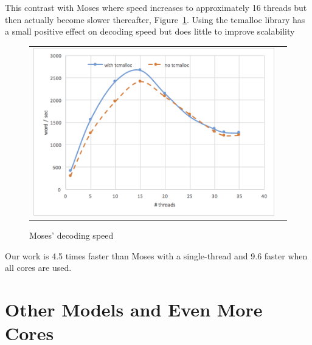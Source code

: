 \documentclass[11pt]{article}
\begin{document}
This contrast with Moses where speed increases to approximately 16 threads but then actually become slower thereafter, Figure~\ref{fig:moses-speed}. Using the tcmalloc library has a small positive effect on decoding speed but does little to improve scalability 
\begin{figure}[h]
\centering
\begin{tabular}{cc}
{\includegraphics[scale=0.5]{moses-scalability.png}} 
\end{tabular}
\caption{Moses' decoding speed}
\label{fig:moses-speed}
\end{figure} 


Our work is 4.5 times faster than Moses with a single-thread and 9.6 faster when all cores are used.

 

\section{Other Models and Even More Cores}
\end{document}
